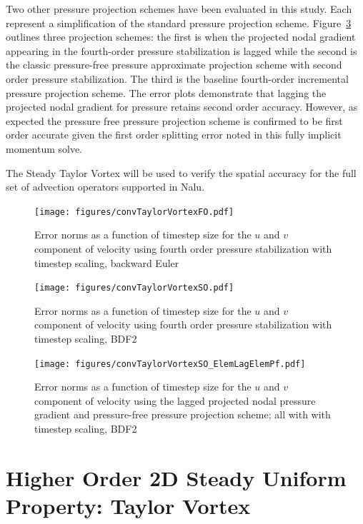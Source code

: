 Two other pressure projection schemes have been evaluated in this study. Each represent a 
simplification of the standard pressure projection scheme. Figure~\ref{fig:hybridTstep} outlines
three projection schemes: the first is when the projected nodal gradient appearing in the fourth-order pressure stabilization 
is lagged while the second is the classic pressure-free pressure approximate projection scheme with second order pressure stabilization. 
The third is the baseline fourth-order incremental pressure projection scheme. The error plots demonstrate that lagging the projected nodal 
gradient for pressure retains second order accuracy. However, as expected the pressure
free pressure projection scheme is confirmed to be first order accurate given the first order splitting error noted in this fully implicit momentum solve.

The Steady Taylor Vortex will be used to verify the spatial accuracy for the full set of advection
operators supported in Nalu.
 
\begin{figure}
\centerline{\texttt{[image: figures/convTaylorVortexFO.pdf]}}
\caption{Error norms as a function of timestep size for the $u$ and $v$
component of velocity using fourth order pressure stabilization with timestep scaling, backward Euler}
\label{fig:fo4thTstep}
\end{figure}

\begin{figure}
\centerline{\texttt{[image: figures/convTaylorVortexSO.pdf]}}
\caption{Error norms as a function of timestep size for the $u$ and $v$
component of velocity using fourth order pressure stabilization with timestep scaling, BDF2}
\label{fig:so4thTstep}
\end{figure}

\begin{figure}
\centerline{\texttt{[image: figures/convTaylorVortexSO\_ElemLagElemPf.pdf]}}
\caption{Error norms as a function of timestep size for the $u$ and $v$
component of velocity using the lagged projected nodal pressure gradient and pressure-free pressure projection scheme; all with with timestep scaling, BDF2}
\label{fig:hybridTstep}
\end{figure}

\section{Higher Order 2D Steady Uniform Property: Taylor Vortex}

